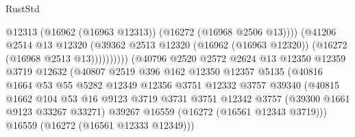 \begin{lexlean}{RustStd}
\begin{coremodule}
                                              @12313
                                              (@16962 (@16963 @12313))
                                              (@16272 (@16968 @2506 @13))))
                                          (@41206
                                            @2514
                                            @13
                                            @12320
                                            (@39362
                                              @2513
                                              @12320
                                              (@16962 (@16963 @12320))
                                              (@16272 (@16968 @2513 @13))))))))))
                              (@40796
                                @2520
                                @2572
                                @2624
                                @13
                                @12350
                                @12359
                                @3719
                                @12632
                                (@40807
                                  @2519
                                  @396
                                  @162
                                  @12350
                                  @12357
                                  @5135
                                  (@40816
                                    @1664
                                    @53
                                    @55
                                    @5282
                                    @12349
                                    @12356
                                    @3751
                                    @12332
                                    @3757
                                    @39340
                                    (@40815
                                      @1662
                                      @104
                                      @53
                                      @16
                                      @9123
                                      @3719
                                      @3731
                                      @3751
                                      @12342
                                      @3757
                                      (@39300 @1661 @9123 @33267 @33271)
                                      @39267
                                      @16559
                                      (@16272 (@16561 @12343 @3719)))
                                    @16559
                                    (@16272 (@16561 @12333 @12349)))

\end{coremodule}
\end{lexlean}
